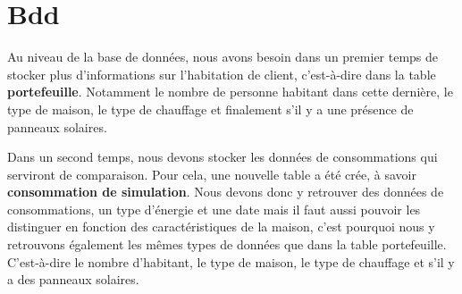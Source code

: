 \section{Bdd}

\begin{flushleft}
Au niveau de la base de données, nous avons besoin dans un premier temps de stocker plus d'informations sur l'habitation de client, c'est-à-dire dans la table \textbf{portefeuille}. Notamment le nombre de personne habitant dans cette dernière, le type de maison, le type de chauffage et finalement s'il y a une présence de panneaux solaires.
\end{flushleft}

\begin{flushleft}
Dans un second temps, nous devons stocker les données de consommations qui serviront de comparaison. Pour cela, une nouvelle table a été crée, à savoir \textbf{consommation de simulation}. Nous devons donc y retrouver des données de consommations, un type d'énergie et une date mais il faut aussi pouvoir les distinguer en fonction des caractéristiques de la maison, c'est pourquoi nous y retrouvons également les mêmes types de données que dans la table portefeuille. C'est-à-dire le nombre d'habitant, le type de maison, le type de chauffage et s'il y a des panneaux solaires.
\end{flushleft}


